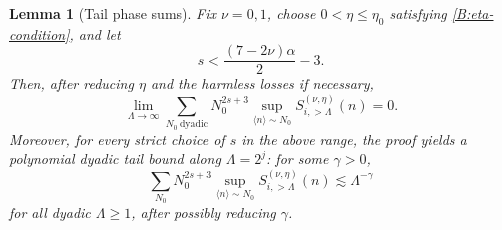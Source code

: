 \documentclass[10pt]{amsart}
\numberwithin{equation}{section}
\theoremstyle{plain}
\newtheorem{lemma}[theorem]{Lemma}
\theoremstyle{definition}
\theoremstyle{remark}
\newcommand{\la}{\langle}
\newcommand{\ra}{\rangle}
\begin{document}
\begin{lemma}[Tail phase sums]\label{lem:B-tail-sums}
Fix \(\nu=0,1\), choose \(0<\eta\le\eta_0\) satisfying \eqref{B:eta-condition}, and let
\[
        s<\frac{(7-2\nu)\alpha}{2}-3.
\]
Then, after reducing \(\eta\) and the harmless losses if necessary,
\begin{equation}\label{B:tail-sum-target}
        \lim_{\Lambda\to\infty}
        \sum_{N_0\ \mathrm{dyadic}}
        N_0^{2s+3}
        \sup_{\la n\ra\sim N_0}
        S_{i,>\Lambda}^{(\nu,\eta)}(n)=0.
\end{equation}
Moreover, for every strict choice of \(s\) in the above range, the proof yields a polynomial dyadic tail bound along \(\Lambda=2^j\): for some \(\gamma>0\),
\begin{equation}\label{B:tail-polynomial}
        \sum_{N_0}
        N_0^{2s+3}
        \sup_{\la n\ra\sim N_0}
        S_{i,>\Lambda}^{(\nu,\eta)}(n)
        \lesssim \Lambda^{-\gamma}
\end{equation}
for all dyadic \(\Lambda\ge1\), after possibly reducing \(\gamma\).
\end{lemma}
\end{document}

